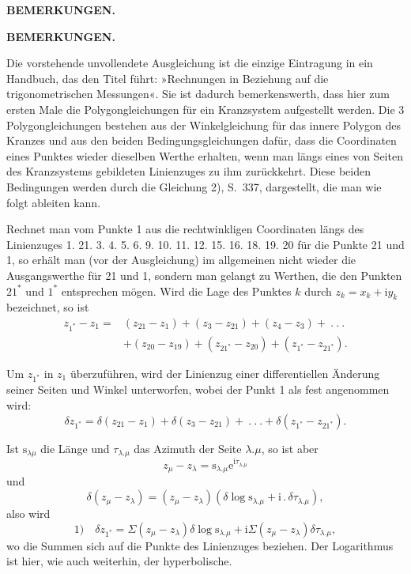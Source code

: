 \hfill\textbf{BEMERKUNGEN.}\hfill\mbox{}
\begin{center}\textbf{BEMERKUNGEN.}\end{center}

\par\noindent\hspace*{\parindent}Die vorstehende unvollendete Ausgleichung ist die einzige Eintragung in ein Handbuch, das den Titel führt: »Rechnungen in Beziehung auf die trigonometrischen Messungen«. Sie ist dadurch bemerkenswerth, dass hier zum ersten Male die Polygongleichungen für ein Kranzsystem aufgestellt werden. Die 3 Polygongleichungen bestehen aus der Winkelgleichung für das innere Polygon des Kranzes und aus den beiden Bedingungsgleichungen dafür, dass die Coordinaten eines Punktes wieder dieselben Werthe erhalten, wenn man längs eines von Seiten des Kranzsystems gebildeten Linienzuges zu ihm zurückkehrt. Diese beiden Bedingungen werden durch die Gleichung 2), S.~337, dargestellt, die man wie folgt ableiten kann.

\par\noindent\hspace*{\parindent}Rechnet man vom Punkte 1 aus die rechtwinkligen Coordinaten längs des Linienzuges 1. 21. 3. 4. 5. 6. 9. 10. 11. 12. 15. 16. 18. 19. 20 für die Punkte 21 und 1, so erhält man (vor der Ausgleichung) im allgemeinen nicht wieder die Ausgangswerthe für 21 und 1, sondern man gelangt zu Werthen, die den Punkten \(21^*\) und \(1^*\) entsprechen mögen. Wird die Lage des Punktes \(k\) durch \(z_k=x_k+\mathrm{i}y_k\) bezeichnet, so ist
\[
\begin{aligned}
z_{1^*}-z_1={}&(z_{21}-z_1)+(z_3-z_{21})+(z_4-z_3)+\ .\ .\ .\\
&+(z_{20}-z_{19})+(z_{21^*}-z_{20})+(z_{1^*}-z_{21^*}).
\end{aligned}
\]
\par\noindent\hspace*{\parindent}Um \(z_{1^*}\) in \(z_1\) überzuführen, wird der Linienzug einer differentiellen Änderung seiner Seiten und Winkel unterworfen, wobei der Punkt 1 als fest angenommen wird:
\[
\delta z_{1^*}=\delta(z_{21}-z_1)+\delta(z_3-z_{21})+\ .\ .\ .+\delta(z_{1^*}-z_{21^*}).
\]
\par\noindent\hspace*{\parindent}Ist \(\mathrm{s}_{\lambda\mu}\) die Länge und \(\tau_{\lambda.\mu}\) das Azimuth der Seite \(\lambda.\mu\), so ist aber
\[
z_\mu-z_\lambda=\mathrm{s}_{\lambda.\mu}\mathrm{e}^{\mathrm{i}\tau_{\lambda.\mu}}
\]
\noindent und
\[
\delta(z_\mu-z_\lambda)=(z_\mu-z_\lambda)(\delta\log\mathrm{s}_{\lambda.\mu}+\mathrm{i}\,.\,\delta\tau_{\lambda.\mu}),
\]
\noindent also wird
\[
1)\quad\delta z_{1^*}=\Sigma(z_\mu-z_\lambda)\delta\log\mathrm{s}_{\lambda.\mu}+\mathrm{i}\Sigma(z_\mu-z_\lambda)\delta\tau_{\lambda.\mu},
\]
\noindent wo die Summen sich auf die Punkte des Linienzuges beziehen. Der Logarithmus ist hier, wie auch weiterhin, der hyperbolische.

